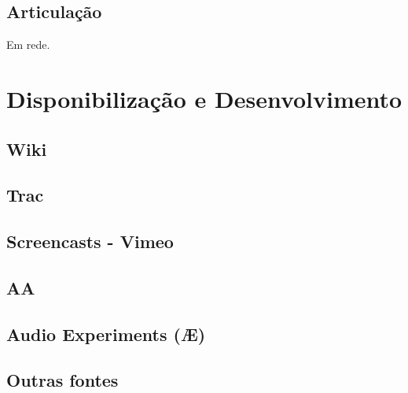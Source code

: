 \subsection{Articulação}

Em rede.



\section{Disponibilização e Desenvolvimento}

\subsection{Wiki}

\subsection{Trac}

\subsection{Screencasts - Vimeo}

\subsection{AA}

\subsection{Audio Experiments (Æ)}

\subsection{Outras fontes}